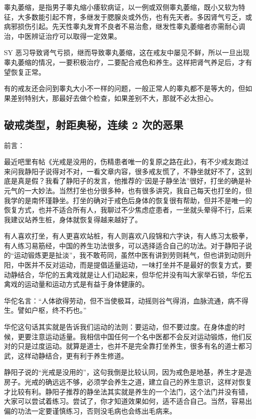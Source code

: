 \documentclass[fontset=founder]{ctexart}
\begin{document}
睾丸萎缩，是指男子睾丸缩小痿软病证，以一例或双侧睾丸萎缩，既小又软为特征，大多数能引起不育，多继发于腮腺炎或外伤，也有先天者。多因肾气亏乏，或病邪损伤引起。先天性睾丸发育不良者不易治愈，继发性睾丸萎缩者亦需耐心调治，中医辨证治疗可以取得一定效果。

SY 恶习导致肾气亏损，继而导致睾丸萎缩，这在戒友中屡见不鲜，所以一旦出现睾丸萎缩的情况，一要积极治疗，二要配合戒色和养生。这样把肾气养足后，才有望恢复正常。

有的戒友还会问到睾丸大小不一样的问题，一般正常人的睾丸都不是等大的，但如果差别特别大，那最好去做个检查，如果差别不大，那就不必太担心。

\subsection{破戒类型，射距奥秘，连续 2 次的恶果}

前言：

最近吧里有帖《光戒是没用的，伤精患者唯一的复原之路在此》，有不少戒友跑过来问我静阳子说得对不对，一看文章内容，很多戒友慌了，不静坐就好不了，这到底是真是假？我看了静阳子的发言，他推荐的“因是子静坐法”很好，打坐的确是补元气的一大妙法。当然打坐也分很多种，也有很多讲究，我自己每天也打坐的，但我学的是南怀瑾静坐。打坐的确对于戒色后身体的恢复很有帮助，但并不是唯一的恢复方式，也并不适合所有人，我聊过不少焦虑症患者，一坐就头晕得不行，后来我建议站养生桩，身体就恢复得越来越好了。

有人喜欢打坐，有人更喜欢站桩，有人则喜欢八段锦和六字诀，有人练习太极拳，有人练习易筋经，中国的养生功法很多，可以选择适合自己的功法。对于静阳子说的“运动锻炼更是扯淡”，我不敢苟同，虽然中医有讲到劳则耗气，但也讲到动则升阳，中医并不反对运动，而是提倡适量运动，一味打坐并不是最好的恢复方式，要动静结合，华佗的五禽戏就是让人们动起来，但华佗并没有叫大家举石锁，华佗五禽戏的运动量和运动方式是有益于身体健康的。

华佗名言：“人体欲得劳动，但不当使极耳，动摇则谷气得消，血脉流通，病不得生。譬如户枢，终不朽也。”

华佗这句话其实就是告诉我们运动的法则：要运动，但不要过度。在身体虚的时候，更要注意运动适量。我相信中国任何一个名中医都不会反对运动锻炼，他们反对的只是过度运动。就算是道士，也并不是完全靠打坐养生，很多有名的道士都习武，这样动静结合，更有利于养生修道。

静阳子说的“光戒是没用的”，这句我倒是比较认同，因为戒色是地基，养生才是造房子。光戒的确远远不够，必须学会养生之道，建立自己的养生意识，这样对恢复才比较有利。静阳子推荐的静坐法其实就是养生的一个法门，这个法门并没有错，大家可以尝试着练习。尝试了，你才知道效果如何，适不适合自己。当然，容易出偏的功法一定要谨慎练习，否则没毛病也会练出毛病来。
\end{document}
